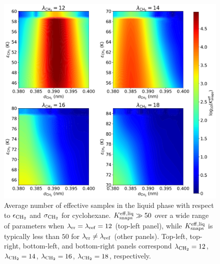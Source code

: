 \documentclass[journal=jced,manuscript=article]{achemso}
\begin{document}
	\begin{figure}[htb!]
		\centering
		\includegraphics[width=6.4in]{CYC6_Neff_lam.pdf}
		\caption{Average number of effective samples in the liquid phase with respect to $\epsilon_{\rm CH_2}$ and $\sigma_{\rm CH_2}$ for cyclohexane. $K_{\rm snaps}^{\rm eff, liq} \gg 50$ over a wide range of parameters when $\lambda_{\rm rr} = \lambda_{\rm ref} = 12$ (top-left panel), while $K_{\rm snaps}^{\rm eff, liq}$ is typically less than $50$ for $\lambda_{\rm rr} \neq \lambda_{\rm ref}$ (other panels). Top-left, top-right, bottom-left, and bottom-right panels correspond $\lambda_{\rm CH_2} = 12$, $\lambda_{\rm CH_2} = 14$, $\lambda_{\rm CH_2} = 16$, $\lambda_{\rm CH_2} = 18$, respectively.}
		\label{fig:Neff_CYC6}
	\end{figure}
\end{document}
